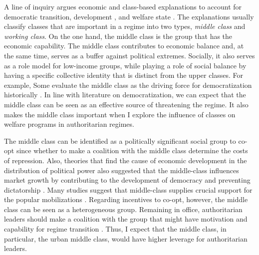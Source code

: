 \documentclass[11pt]{article}
\begin{document}
A line of inquiry argues economic and class-based explanations to account for democratic transition, development \citep[4-5]{ziblatt2017conservative}, and welfare state \citep{Huber1993,HuberStephens2001,Korpi2006}. The explanations usually classify classes that are important in a regime into two types, \textit{middle class} and \textit{working class}. On the one hand, the middle class is the group that has the economic capability. The middle class contributes to economic balance and, at the same time, serves as a buffer against political extremes. Socially, it also serves as a role model for low-income groups, while playing a role of social balance by having a specific collective identity that is distinct from the upper classes. For example, Some evaluate the middle class as the driving force for democratization historically \citep{Moore1993Social}. In line with literature on democratization, we can expect that the middle class can be seen as an effective source of threatening the regime. It also makes the middle class important when I explore the influence of classes on welfare programs in authoritarian regimes.

The middle class can be identified as a politically significant social group to co-opt since whether to make a coalition with the middle class determine the costs of repression. Also, theories that find the cause of economic development in the distribution of political power also suggested that the middle-class influences market growth by contributing to the development of democracy and preventing dictatorship \citep{Easterly2001}. Many studies suggest that middle-class supplies crucial support for the popular mobilizations \citep{Rosenfeld2017, Dahlum2019}. Regarding incentives to co-opt, however, the middle class can be seen as a heterogeneous group. Remaining in office, authoritarian leaders should make a coalition with the group that might have motivation and capability for regime transition \citep{Dahlum2019}. Thus, I expect that the middle class, in particular, the urban middle class, would have higher leverage for authoritarian leaders.
\end{document}
